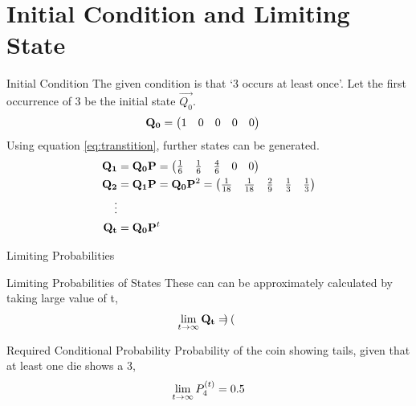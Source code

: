 \documentclass{beamer}
\begin{document}
\section{Initial Condition and Limiting State}
\begin{frame}{Initial Condition}
     The given condition is that \lq3 occurs at least once\rq. Let the first occurrence of 3 be the initial state $ \vec{Q_0}$.
    \begin{align}
        \mathbf{Q_0} &= \begin{pmatrix}1 & 0 & 0 & 0 & 0\end{pmatrix} 
    \end{align}
    Using equation \eqref{eq:transtition}, further states can be generated.
    \begin{align}
        \mathbf{Q_1} &= \mathbf{Q_{0}} \mathbf{P}
            = \begin{pmatrix}\frac{1}{6} & \frac{1}{6} & \frac{4}{6} & 0 & 0\end{pmatrix}\\
        \mathbf{Q_2} &=  \mathbf{Q_1} \mathbf{P} =\mathbf{Q_0} \mathbf{P}^{2}
            = \begin{pmatrix}\frac{1}{18} & \frac{1}{18} & \frac{2}{9} & \frac{1}{3} & \frac{1}{3}\end{pmatrix}\\   
        \vdots \\
        \mathbf{Q_t} &= \mathbf{Q_0} \mathbf{P}^{t}  
    \end{align}
\end{frame}
\begin{frame}{Limiting Probabilities}
    \begin{block}{Limiting Probabilities of States}
    These can can be approximately calculated by taking large value of t,
    \begin{align}
       \lim_{t \to \infty}  \mathbf{Q_t} &= 
       \begin{pmatrix}\end{pmatrix} 
    \end{align}
    \end{block}
    \begin{block}{Required Conditional Probability}
    Probability of the coin showing tails, given that at least one die shows a 3,
    \begin{align}
       \lim_{t \to \infty} P_{4}^{\left(t\right)}  = 0.5
    \end{align}
    \end{block}
\end{frame}
\end{document}
